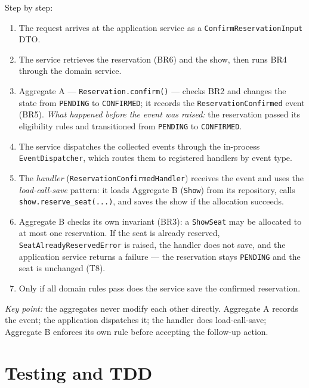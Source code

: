 \documentclass[11pt,a4paper]{article}
\newcommand{\code}[1]{\texttt{#1}}
\begin{document}
\noindent Step by step:

\begin{enumerate}
  \item The request arrives at the application service as a
        \code{ConfirmReservationInput} DTO.
  \item The service retrieves the reservation (BR6) and the show, then runs BR4
        through the domain service.
  \item Aggregate A --- \code{Reservation.confirm()} --- checks BR2 and changes
        the state from \code{PENDING} to \code{CONFIRMED}; it records the
        \code{ReservationConfirmed} event (BR5). \emph{What happened before the
        event was raised:} the reservation passed its eligibility rules and
        transitioned from \code{PENDING} to \code{CONFIRMED}.
  \item The service dispatches the collected events through the in-process
        \code{EventDispatcher}, which routes them to registered handlers by
        event type.
  \item The \emph{handler} (\code{ReservationConfirmedHandler}) receives the
        event and uses the \emph{load-call-save} pattern: it loads Aggregate B
        (\code{Show}) from its repository, calls \code{show.reserve\_seat(...)},
        and saves the show if the allocation succeeds.
  \item Aggregate B checks its own invariant (BR3): a \code{ShowSeat} may be
        allocated to at most one reservation. If the seat is already reserved,
        \code{SeatAlreadyReservedError} is raised, the handler does not save,
        and the application service returns a failure --- the reservation stays
        \code{PENDING} and the seat is unchanged (T8).
  \item Only if all domain rules pass does the service save the confirmed
        reservation.
\end{enumerate}

\emph{Key point:} the aggregates never modify each other directly. Aggregate A
records the event; the application dispatches it; the handler does load-call-save;
Aggregate B enforces its own rule before accepting the follow-up action.

\section{Testing and TDD}
\end{document}
